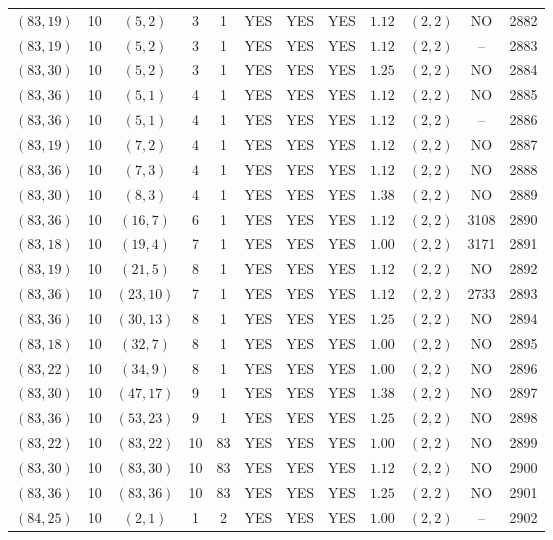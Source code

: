 \begin{longtable}{|c|c|c|c|c|c|c|c|c|c|c|c|}
$(83,19)$ & 10 & $(5,2)$ & 3 & 1 & YES & YES & YES & $1.12$ & $(2,2)$ & NO & 2882\\
$(83,19)$ & 10 & $(5,2)$ & 3 & 1 & YES & YES & YES & $1.12$ & $(2,2)$ & -- & 2883\\
$(83,30)$ & 10 & $(5,2)$ & 3 & 1 & YES & YES & YES & $1.25$ & $(2,2)$ & NO & 2884\\
$(83,36)$ & 10 & $(5,1)$ & 4 & 1 & YES & YES & YES & $1.12$ & $(2,2)$ & NO & 2885\\
$(83,36)$ & 10 & $(5,1)$ & 4 & 1 & YES & YES & YES & $1.12$ & $(2,2)$ & -- & 2886\\
$(83,19)$ & 10 & $(7,2)$ & 4 & 1 & YES & YES & YES & $1.12$ & $(2,2)$ & NO & 2887\\
$(83,36)$ & 10 & $(7,3)$ & 4 & 1 & YES & YES & YES & $1.12$ & $(2,2)$ & NO & 2888\\
$(83,30)$ & 10 & $(8,3)$ & 4 & 1 & YES & YES & YES & $1.38$ & $(2,2)$ & NO & 2889\\
$(83,36)$ & 10 & $(16,7)$ & 6 & 1 & YES & YES & YES & $1.12$ & $(2,2)$ & 3108 & 2890\\
$(83,18)$ & 10 & $(19,4)$ & 7 & 1 & YES & YES & YES & $1.00$ & $(2,2)$ & 3171 & 2891\\
$(83,19)$ & 10 & $(21,5)$ & 8 & 1 & YES & YES & YES & $1.12$ & $(2,2)$ & NO & 2892\\
$(83,36)$ & 10 & $(23,10)$ & 7 & 1 & YES & YES & YES & $1.12$ & $(2,2)$ & 2733 & 2893\\
$(83,36)$ & 10 & $(30,13)$ & 8 & 1 & YES & YES & YES & $1.25$ & $(2,2)$ & NO & 2894\\
$(83,18)$ & 10 & $(32,7)$ & 8 & 1 & YES & YES & YES & $1.00$ & $(2,2)$ & NO & 2895\\
$(83,22)$ & 10 & $(34,9)$ & 8 & 1 & YES & YES & YES & $1.00$ & $(2,2)$ & NO & 2896\\
$(83,30)$ & 10 & $(47,17)$ & 9 & 1 & YES & YES & YES & $1.38$ & $(2,2)$ & NO & 2897\\
$(83,36)$ & 10 & $(53,23)$ & 9 & 1 & YES & YES & YES & $1.25$ & $(2,2)$ & NO & 2898\\
$(83,22)$ & 10 & $(83,22)$ & 10 & 83 & YES & YES & YES & $1.00$ & $(2,2)$ & NO & 2899\\
$(83,30)$ & 10 & $(83,30)$ & 10 & 83 & YES & YES & YES & $1.12$ & $(2,2)$ & NO & 2900\\
$(83,36)$ & 10 & $(83,36)$ & 10 & 83 & YES & YES & YES & $1.25$ & $(2,2)$ & NO & 2901\\
$(84,25)$ & 10 & $(2,1)$ & 1 & 2 & YES & YES & YES & $1.00$ & $(2,2)$ & -- & 2902\\

\end{longtable}
